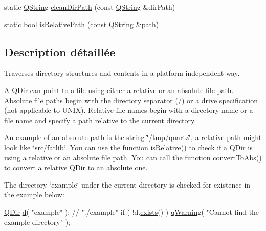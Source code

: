 \begin{DoxyCompactItemize}
\item 
static \hyperlink{class_q_string}{Q\+String} \hyperlink{class_q_dir_ad38037708dc754f5bdd877c145dbbb19}{clean\+Dir\+Path} (const \hyperlink{class_q_string}{Q\+String} \&dir\+Path)
\item 
static \hyperlink{qglobal_8h_a1062901a7428fdd9c7f180f5e01ea056}{bool} \hyperlink{class_q_dir_a500524767f07a8cf127392859cc41d49}{is\+Relative\+Path} (const \hyperlink{class_q_string}{Q\+String} \&\hyperlink{class_q_dir_adc89b85ad2479f2b3baf899bfbe48f7f}{path})
\end{DoxyCompactItemize}


\subsection{Description détaillée}
Traverses directory structures and contents in a platform-\/independent way. 

\hyperlink{class_a}{A} \hyperlink{class_q_dir}{Q\+Dir} can point to a file using either a relative or an absolute file path. Absolute file paths begin with the directory separator (\textquotesingle{}/\textquotesingle{}) or a drive specification (not applicable to U\+N\+I\+X). Relative file names begin with a directory name or a file name and specify a path relative to the current directory.

An example of an absolute path is the string \char`\"{}/tmp/quartz\char`\"{}, a relative path might look like \char`\"{}src/fatlib\char`\"{}. You can use the function \hyperlink{class_q_dir_a0d7232dab091230bfabb81ba2d2329ef}{is\+Relative()} to check if a \hyperlink{class_q_dir}{Q\+Dir} is using a relative or an absolute file path. You can call the function \hyperlink{class_q_dir_a0c05c8978b3b4158233f809e4d30c55d}{convert\+To\+Abs()} to convert a relative \hyperlink{class_q_dir}{Q\+Dir} to an absolute one.

The directory \char`\"{}example\char`\"{} under the current directory is checked for existence in the example below\+:


\begin{DoxyCode}
\hyperlink{class_q_dir}{QDir} \hyperlink{058__bracket__recursion_8tcl_af43f4b1f0064a33b2d662af9f06d3a00}{d}( \textcolor{stringliteral}{"example"} );          \textcolor{comment}{// "./example"}
\textcolor{keywordflow}{if} ( !d.\hyperlink{class_q_dir_a1294085ddb97ecd3643b700feb3fabea}{exists}() )
\hyperlink{qglobal_8cpp_addd9b8ef474319fc95ba80d46fbd1e94}{qWarning}( \textcolor{stringliteral}{"Cannot find the example directory"} );
\end{DoxyCode}



